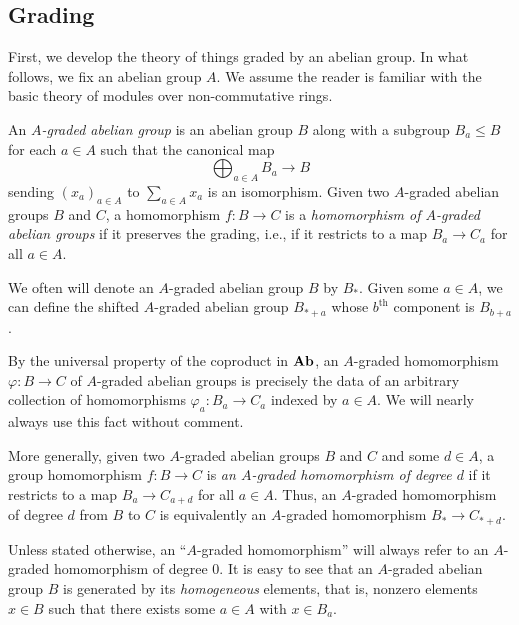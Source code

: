 \documentclass[../main.tex]{subfiles}
\begin{document}
\subsection{Grading}

First, we develop the theory of things graded by an abelian group. In what follows, we fix an abelian group $A$. We assume the reader is familiar with the basic theory of modules over non-commutative rings.

\begin{definition}\label{graded_abgrp}
	An \emph{$A$-graded abelian group} is an abelian group $B$ along with a subgroup $B_a\leq B$ for each $a\in A$ such that the canonical map
	\[\bigoplus_{a\in A}B_a\to B\]
	sending $(x_a)_{a\in A}$ to $\sum_{a\in A}x_a$ is an isomorphism. Given two $A$-graded abelian groups $B$ and $C$, a homomorphism $f:B\to C$ is a \textit{homomorphism of $A$-graded abelian groups} if it preserves the grading, i.e., if it restricts to a map $B_a\to C_a$ for all $a\in A$. 
\end{definition}

\begin{remark}
	We often will denote an $A$-graded abelian group $B$ by $B_*$. Given some $a\in A$, we can define the shifted $A$-graded abelian group $B_{*+a}$ whose $b^\text{th}$ component is $B_{b+a}$.
\end{remark}

\begin{remark}
	By the universal property of the coproduct in $\mathbf{Ab}$, an $A$-graded homomorphism $\varphi:B\to C$ of $A$-graded abelian groups is precisely the data of an arbitrary collection of homomorphisms $\varphi_a:B_a\to C_a$ indexed by $a\in A$. We will nearly always use this fact without comment.
\end{remark}

\begin{definition}
    More generally, given two $A$-graded abelian groups $B$ and $C$ and some $d\in A$, a group homomorphism $f:B\to C$ is \emph{an $A$-graded homomorphism of degree $d$} if it restricts to a map $B_a\to C_{a+d}$ for all $a\in A$. Thus, an $A$-graded homomorphism of degree $d$ from $B$ to $C$ is equivalently an $A$-graded homomorphism $B_*\to C_{*+d}$.
\end{definition}

Unless stated otherwise, an ``$A$-graded homomorphism'' will always refer to an $A$-graded homomorphism of degree $0$. It is easy to see that an $A$-graded abelian group $B$ is generated by its \emph{homogeneous} elements, that is, nonzero elements $x\in B$ such that there exists some $a\in A$ with $x\in B_a$.
\end{document}
